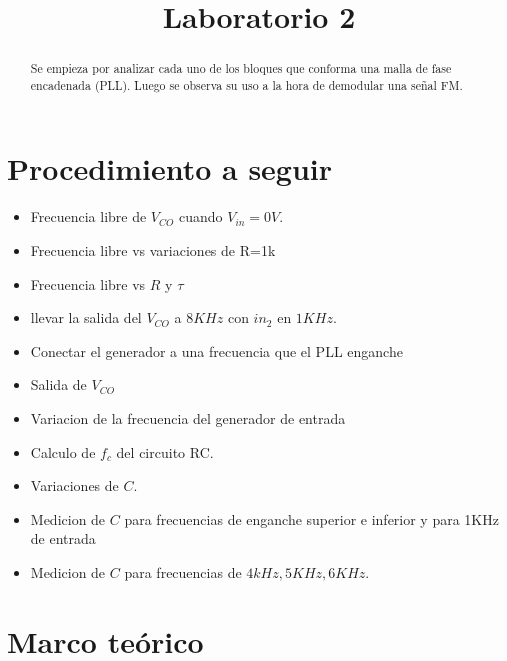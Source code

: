 \documentclass[10pt,a4paper]{IEEEtran}
\begin{document}
\title{Laboratorio 2}
\author{}

\maketitle

\begin{abstract}
    Se empieza por analizar cada uno de los bloques que conforma una malla de fase encadenada (PLL). Luego se observa su uso a la hora de demodular una señal FM. 
\end{abstract}
\section{Procedimiento a seguir}
\begin{itemize}
	\item Frecuencia libre de $V_{CO}$ cuando $V_{in}=0V$.
	\item Frecuencia libre vs variaciones de R=1k %
	\item Frecuencia libre vs $R$ y $\tau$
	\item llevar la salida del $V_{CO}$ a $8KHz$ con $in_2$ en $1KHz$.
	\item Conectar el generador a una frecuencia que el PLL enganche %
	\item Salida de $V_{CO}$
	\item Variacion de la frecuencia del generador de entrada
	\item Calculo de $f_c$ del circuito RC.
	\item Variaciones de $C$.
	\item Medicion de $C$ para frecuencias de enganche superior e inferior y para 1KHz de entrada 
	\item Medicion de $C$ para frecuencias de $4kHz, 5KHz, 6KHz$.
\end{itemize}

    \section{Marco teórico}
\end{document}
